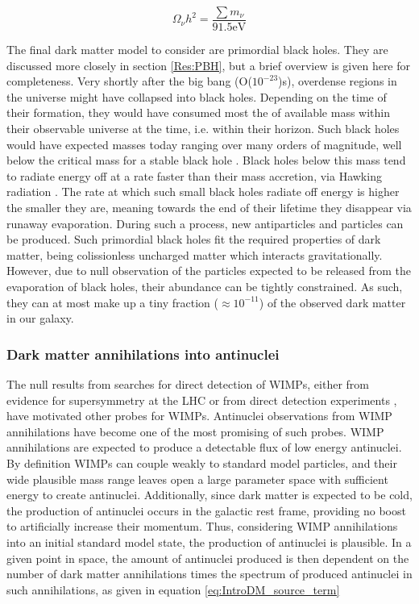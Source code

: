 \begin{equation}\label{eq:NeutrinoAbundance}
    \Omega_\nu h^2 = \frac{\sum m_\nu}{91.5 \mathrm{eV}}
\end{equation}

The final dark matter model to consider are primordial black holes. They are discussed more closely in section \ref{Res:PBH}, but a brief overview is given here for completeness. Very shortly after the big bang (O($10^{-23}$)s), overdense regions in the universe might have collapsed into black holes. Depending on the time of their formation, they would have consumed most the of available mass within their observable universe at the time, i.e. within their horizon. Such black holes would have expected masses today ranging over many orders of magnitude, well below the critical mass for a stable black hole \cite{}. Black holes below this mass tend to radiate energy off at a rate faster than their mass accretion, via Hawking radiation \cite{}. The rate at which such small black holes radiate off energy is higher the smaller they are, meaning towards the end of their lifetime they disappear via runaway evaporation. During such a process, new antiparticles and particles can be produced. Such primordial black holes fit the required properties of dark matter, being colissionless uncharged matter which interacts gravitationally. However, due to null observation of the particles expected to be released from the evaporation of black holes, their abundance can be tightly constrained. As such, they can at most make up a tiny fraction ($\approx 10^{-11}$) of the observed dark matter in our galaxy.

\subsubsection{Dark matter annihilations into antinuclei}
The null results from searches for direct detection of WIMPs, either from evidence for supersymmetry at the LHC\cite{} or from direct detection experiments \cite{}, have motivated other probes for WIMPs. Antinuclei observations from WIMP annihilations have become one of the most promising of such probes. WIMP annihilations are expected to produce a detectable flux of low energy antinuclei\cite{}. By definition WIMPs can couple weakly to standard model particles, and their wide plausible mass range leaves open a large parameter space with sufficient energy to create antinuclei. Additionally, since dark matter is expected to be cold, the production of antinuclei occurs in the galactic rest frame, providing no boost to artificially increase their momentum. Thus, considering WIMP annihilations into an initial standard model state, the production of antinuclei is plausible. In a given point in space, the amount of antinuclei produced is then dependent on the number of dark matter annihilations times the spectrum of produced antinuclei in such annihilations, as given in equation \ref{eq:IntroDM_source_term}

